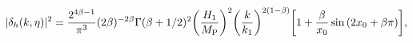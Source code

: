 \begin{equation}
|\delta_{h}(k, \eta)|^2 = \frac{2^{4 \beta -1}}{ \pi^3  } (  2 \beta )^{ - 2 \beta}
\Gamma(\beta + 1/2)^2 
\biggl(\frac{H_1}{M_{\rm P}}\biggr)^2   
\biggl(\frac{k}{k_1}\biggr)^{2(1 - \beta)} \biggl[ 1  +
\frac{\beta}{ x_{0} } \sin {(2 x_0 + \beta \pi)}\biggr],
\label{psd}
\end{equation}

